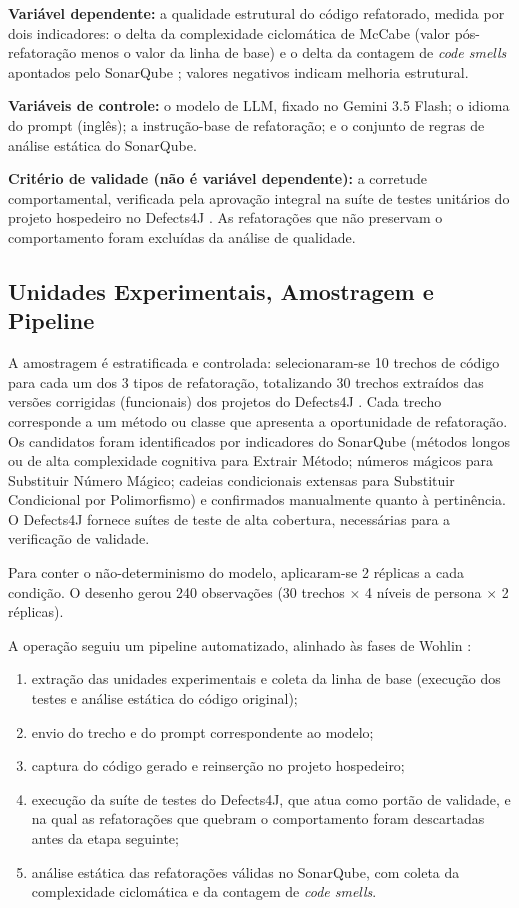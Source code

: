 \documentclass[10pt,conference,a4paper,twocolumn]{article}
\begin{document}
\textbf{Variável dependente:} a qualidade estrutural do código refatorado, medida por dois indicadores: o delta da complexidade ciclomática de McCabe \cite{mccabe1976} (valor pós-refatoração menos o valor da linha de base) e o delta da contagem de \textit{code smells} apontados pelo SonarQube \cite{sonarqube}; valores negativos indicam melhoria estrutural.

\textbf{Variáveis de controle:} o modelo de LLM, fixado no Gemini 3.5 Flash; o idioma do prompt (inglês); a instrução-base de refatoração; e o conjunto de regras de análise estática do SonarQube.

\textbf{Critério de validade (não é variável dependente):} a corretude comportamental, verificada pela aprovação integral na suíte de testes unitários do projeto hospedeiro no Defects4J \cite{defects4j}. As refatorações que não preservam o comportamento foram excluídas da análise de qualidade.

\subsection{Unidades Experimentais, Amostragem e Pipeline}
A amostragem é estratificada e controlada: selecionaram-se 10 trechos de código para cada um dos 3 tipos de refatoração, totalizando 30 trechos extraídos das versões corrigidas (funcionais) dos projetos do Defects4J \cite{defects4j}. Cada trecho corresponde a um método ou classe que apresenta a oportunidade de refatoração. Os candidatos foram identificados por indicadores do SonarQube (métodos longos ou de alta complexidade cognitiva para Extrair Método; números mágicos para Substituir Número Mágico; cadeias condicionais extensas para Substituir Condicional por Polimorfismo) e confirmados manualmente quanto à pertinência. O Defects4J \cite{defects4j} fornece suítes de teste de alta cobertura, necessárias para a verificação de validade.

Para conter o não-determinismo do modelo, aplicaram-se 2 réplicas a cada condição. O desenho gerou 240 observações (30 trechos $\times$ 4 níveis de persona $\times$ 2 réplicas).

A operação seguiu um pipeline automatizado, alinhado às fases de Wohlin \cite{wohlin}:
\begin{enumerate}
    \item extração das unidades experimentais e coleta da linha de base (execução dos testes e análise estática do código original);
    \item envio do trecho e do prompt correspondente ao modelo;
    \item captura do código gerado e reinserção no projeto hospedeiro;
    \item execução da suíte de testes do Defects4J, que atua como portão de validade, e na qual as refatorações que quebram o comportamento foram descartadas antes da etapa seguinte;
    \item análise estática das refatorações válidas no SonarQube, com coleta da complexidade ciclomática e da contagem de \textit{code smells}.
\end{enumerate}
\end{document}
